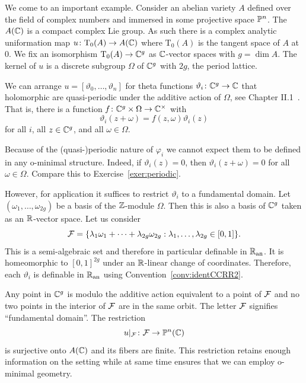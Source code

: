 \begin{example}
  \label{ex:thetafunc}
  We come to an important example. Consider an abelian variety $A$
  defined over the field of complex numbers and immersed in some
  projective space ${\mathbb{P}}^n$.
  The $A({\mathbb{C}})$ is a compact complex Lie group. As such there is a
  complex analytic uniformation map $u\colon \mathrm{T}_0(A) \rightarrow
  A({\mathbb{C}})$
  where $\mathrm{T}_0(A)$ is the tangent space of $A$ at $0$.
  We fix an isomorphism $\mathrm{T}_0(A)\rightarrow{\mathbb{C}}^g$ as
  ${\mathbb{C}}$-vector spaces with $g=\dim A$. The kernel of $u$ is a discrete
  subgroup $\Omega$ of ${\mathbb{C}}^g$ with  $2g$, the period lattice.

  We can arrange $u = [\vartheta_0,\ldots,\vartheta_n]$ for theta
  functions $\vartheta_i \colon {\mathbb{C}}^g \rightarrow{\mathbb{C}}$ that holomorphic
  are quasi-periodic  under the additive action of $\Omega$, see
  Chapter II.1~\cite{MumfordTataLectures}.
  That is, there is a function $f\colon {\mathbb{C}}^g\times \Omega\rightarrow
  {\mathbb{C}}^\times$ with 
  \begin{equation*}
    \vartheta_i(z+\omega) = f(z,\omega) \vartheta_i(z)
  \end{equation*}
  for all $i$, all $z\in{\mathbb{C}}^g$, and all $\omega\in\Omega$. 
  
  Because of the (quasi-)periodic nature of $\varphi_i$ we cannot
  expect them to be defined in any o-minimal structure. Indeed, if
  $\vartheta_i(z)=0$, then $\vartheta_i(z+\omega)=0$ for all
  $\omega\in\Omega$. Compare this to Exercise~\ref{exer:periodic}.
  
  However, for application it suffices to restrict $\vartheta_i$ to a
  fundamental domain. 
  Let $(\omega_1,\ldots,\omega_{2g})$ be a basis of the ${\mathbb{Z}}$-module
  $\Omega$. Then this is also a basis of ${\mathbb{C}}^{g}$ taken as an
  ${\mathbb{R}}$-vector space. Let us consider
  $$ {\mathcal F} = \{\lambda_1\omega_1+\cdots+\lambda_{2g}\omega_{2g} :
  \lambda_1,\ldots,\lambda_{2g}\in [0,1]\}.$$
  This is a semi-algebraic set and therefore in particular definable
  in ${{\mathbb{R}}_{\mathrm{an}}}$. It is homeomorphic to $[0,1]^{2g}$
  under an ${\mathbb{R}}$-linear change of coordinates.
  Therefore, each $\vartheta_i$ is definable in ${{\mathbb{R}}_{\mathrm{an}}}$ using
  Convention~\ref{conv:identCCRR2}. 
  
  Any point in ${\mathbb{C}}^g$ is modulo the additive action
  equivalent to a point of ${\mathcal F}$ and no two points in the interior of ${\mathcal F}$
  are in the same orbit. The letter ${\mathcal F}$ signifies ``fundamental
  domain''. 
  The restriction
  \begin{equation*}
    u|_{{\mathcal F}} \colon {\mathcal F}\rightarrow {\mathbb{P}}^n({\mathbb{C}})
  \end{equation*}
  is surjective onto $A({\mathbb{C}})$ and its fibers are finite.
  This restriction retains enough information on the setting while at
  same time
  ensures that we can employ o-minimal geometry. 


\end{example}
